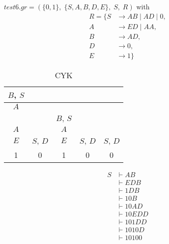 $test6.gr=(\{0, 1\},\;\{ S, A, B, D, E\},\;S,\;R)$ with
\begin{align*}
	R=\{	S &\rightarrow AB\;|\;AD\;|\;0, \\ 
	A &\rightarrow ED\;|\;AA, \\ 
	B &\rightarrow AD, \\ 
	D &\rightarrow 0, \\ 
	E &\rightarrow 1\}
\end{align*}
\begin{table}[h!]
	\centering
	\caption{CYK}
	\begin{tabular}{|c|c|c|c|c|}
		\hline
		$B$, $S$ &  &  &  & \\
		\hline
		$A$ &  &  &  & \\
		\hline
		 &  & $B$, $S$ &  & \\
		\hline
		$A$ &  & $A$ &  & \\
		\hline
		$E$ & $S$, $D$ & $E$ & $S$, $D$ & $S$, $D$\\
		\hline
		\hline
		1 & 0 & 1 & 0 & 0\\
		\hline
	\end{tabular}
\end{table}

\begin{align*}
S &\vdash A B\\ 
 &\vdash E D B \\ 
 &\vdash 1 D B \\ 
 &\vdash 1 0 B \\ 
 &\vdash 1 0 A D \\ 
 &\vdash 1 0 E D D \\ 
 &\vdash 1 0 1 D D \\ 
 &\vdash 1 0 1 0 D \\ 
 &\vdash 1 0 1 0 0
 \end{align*} 